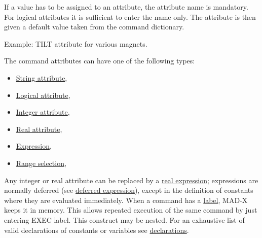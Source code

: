If a value has to be assigned to an attribute, the
attribute name is mandatory.
For logical attributes it is sufficient to enter the name only.
The attribute is then given a default value taken from the
command dictionary.


Example: TILT attribute for various magnets.

The command attributes can have one of the following types:

\begin{itemize}
	\item \href{string.html}{String attribute},
	\item \href{logical.html}{Logical attribute},
	\item \href{integer.html}{Integer attribute},
	\item \href{real.html}{Real attribute},
	\item \href{expression.html}{Expression},
	\item \href{select.html}{Range selection},
\end{itemize}

Any integer or real attribute can be replaced by
a \href{expression.html}{real expression}; expressions are
normally deferred (see \href{expression.html#defer}{deferred
  expression}), except in the 
definition of constants where they are evaluated immediately.
When a command has a \href{label.html}{label},
MAD-X keeps it in memory.
This allows repeated execution of the same command
by just entering EXEC label. This construct may be nested.
For an exhaustive list of valid declarations of constants or variables
see \href{declarations.html}{declarations}.






%
%
%


